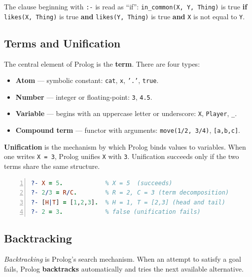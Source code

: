 The clause beginning with \texttt{:-} is read as ``if'': \texttt{in\_common(X,\,Y,\,Thing)}
is true \textbf{if} \texttt{likes(X,\,Thing)} is true \textbf{and}
\texttt{likes(Y,\,Thing)} is true \textbf{and} \texttt{X} is not equal to \texttt{Y}.

\subsection{Terms and Unification}

The central element of Prolog is the \textbf{term}. There are four types:

\begin{itemize}
  \item \textbf{Atom} --- symbolic constant: \texttt{cat}, \texttt{x},
        \texttt{'.'}, \texttt{true}.
  \item \textbf{Number} --- integer or floating-point: \texttt{3}, \texttt{4.5}.
  \item \textbf{Variable} --- begins with an uppercase letter or underscore:
        \texttt{X}, \texttt{Player}, \texttt{\_}.
  \item \textbf{Compound term} --- functor with arguments:
        \texttt{move(1/2,\,3/4)}, \texttt{[a,b,c]}.
\end{itemize}

\textbf{Unification} is the mechanism by which Prolog binds values to
variables. When one writes \texttt{X~=~3}, Prolog unifies \texttt{X} with
\texttt{3}. Unification succeeds only if the two terms share the same
structure.

\begin{lstlisting}[language=Prolog,
    caption={Unification examples},
    label={lst:unification},
    numbers=left,
    basicstyle=\small\ttfamily,
    frame=single]
?- X = 5.            % X = 5  (succeeds)
?- 2/3 = R/C.        % R = 2, C = 3 (term decomposition)
?- [H|T] = [1,2,3].  % H = 1, T = [2,3] (head and tail)
?- 2 = 3.            % false (unification fails)
\end{lstlisting}

\subsection{Backtracking}
\label{subsec:backtracking}

\textit{Backtracking} is Prolog's search mechanism.
When an attempt to satisfy a goal fails, Prolog
\textbf{backtracks} automatically and tries the next available
alternative.

